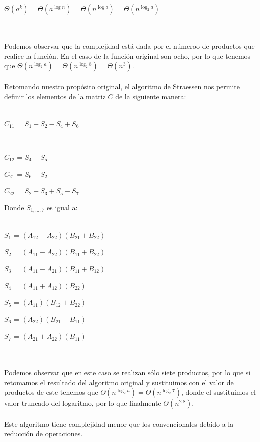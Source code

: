 \documentclass[12pt,twoside]{article}
\begin{document}
\centerline{$\Theta(a^{k})=\Theta(a^{\log{n}})=\Theta(n^{\log{a}})=\Theta(n^{\log_{2}{a}})$}\\\\
Podemos observar que la complejidad est\'a dada por el n\'umeroo de productos que realice la funci\'on. En el caso de la funci\'on original son ocho, por lo que tenemos que $\Theta(n^{\log_{2}{a}})=\Theta(n^{\log_{2}{8}})=\Theta(n^{3})$.\\\\
Retomando nuestro prop\'osito original, el algoritmo de Straessen nos permite definir los elementos de la matriz $C$ de la siguiente manera:\\\\
\centerline{$C_{11}$ = $S_{1}+S_{2}-S_{4}+S_{6}$}\\
\centerline{$C_{12}$ = $S_{4}+S_{5}$}
\centerline{$C_{21}$ = $S_{6}+S_{2}$}
\centerline{$C_{22}$ = $S_{2}-S_{3}+S_{5}-S_{7}$}
Donde $S_{1,...,7}$ es igual a:\\\\
\centerline{$S_{1}$ = $(A_{12}-A_{22})(B_{21}+B_{22})$}
\centerline{$S_{2}$ = $(A_{11}-A_{22})(B_{11}+B_{22})$}
\centerline{$S_{3}$ = $(A_{11}-A_{21})(B_{11}+B_{12})$}
\centerline{$S_{4}$ = $(A_{11}+A_{12})(B_{22})$}
\centerline{$S_{5}$ = $(A_{11})(B_{12}+B_{22})$}
\centerline{$S_{6}$ = $(A_{22})(B_{21}-B_{11})$}
\centerline{$S_{7}$ = $(A_{21}+A_{22})(B_{11})$}\\\\
Podemos observar que en este caso se realizan s\'olo siete productos, por lo que si retomamos el resultado del algoritmo original y sustituimos con el valor de productos de este tenemos que $\Theta(n^{\log_{2}{a}})=\Theta(n^{\log_{2}{7}})$, donde el sustituimos el valor truncado del logaritmo, por lo que finalmente $\Theta(n^{2.8})$.\\\\
Este algoritmo tiene complejidad menor que los convencionales debido a la reducci\'on de operaciones.\\
\end{document}
